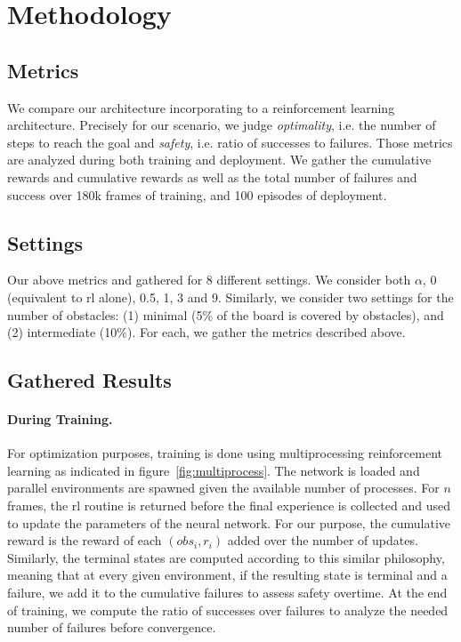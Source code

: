 \section{Methodology} 

\subsection{Metrics}
We compare our architecture incorporating \dio{} to a reinforcement learning architecture. 
Precisely for our scenario, we judge \emph{optimality}, i.e. the number of steps to reach the goal and 
\emph{safety}, i.e. ratio of successes to failures. Those metrics are analyzed during both training and deployment. 
We gather the cumulative rewards and cumulative rewards as well as the total number of failures and success over 180k frames of training, and 100 episodes of deployment. 

\subsection{Settings} 
Our above metrics and gathered for 8 different settings. We consider both $\alpha$, 0 (equivalent to rl alone), 0.5, 1, 3 and 9. 
Similarly, we consider two settings for the number of obstacles: (1)
minimal (5\% of the board is covered by obstacles), and (2)
intermediate (10\%).
For each, we gather the metrics described above. 

\subsection{Gathered Results} 

\paragraph{During Training.} For optimization purposes, training is done using multiprocessing reinforcement learning as indicated in figure~\ref{fig:multiprocess}. 
The network is loaded and parallel environments are spawned given the available number of processes. For $n$ frames, the rl routine is returned before the final experience is collected 
and used to update the parameters of the neural network. For our purpose, the cumulative reward is the reward of each $(obs_i, r_i)$ added over the number of updates. 
Similarly, the terminal states are computed according to this similar philosophy, meaning that at every given environment, if the resulting state is terminal and a failure, we add it to the cumulative failures to assess 
safety overtime. At the end of training, we compute the ratio of successes over failures to analyze the needed number of failures before convergence.

